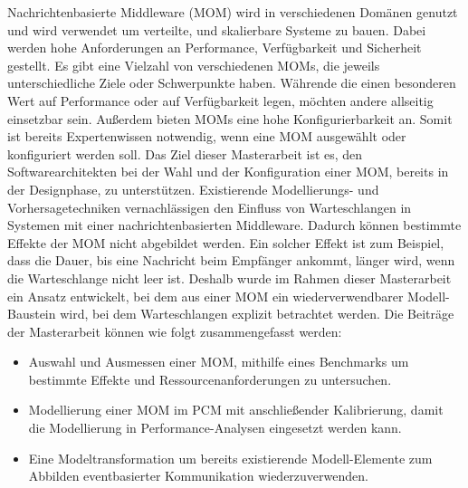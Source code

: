 
\Abstract
Nachrichtenbasierte Middleware (MOM) wird in verschiedenen Domänen genutzt und wird verwendet um verteilte, und skalierbare Systeme zu bauen. Dabei werden hohe Anforderungen an Performance, Verfügbarkeit und Sicherheit gestellt.
Es gibt eine Vielzahl von verschiedenen MOMs, die jeweils unterschiedliche Ziele oder Schwerpunkte haben. Währende die einen besonderen Wert auf Performance oder auf Verfügbarkeit legen, möchten andere allseitig einsetzbar sein. Außerdem bieten MOMs eine hohe Konfigurierbarkeit an. Somit ist bereits Expertenwissen notwendig, wenn eine MOM ausgewählt oder konfiguriert werden soll. Das Ziel dieser Masterarbeit ist es, den Softwarearchitekten bei der Wahl und der Konfiguration einer MOM, bereits in der Designphase, zu unterstützen.
Existierende Modellierungs- und Vorhersagetechniken vernachlässigen den Einfluss von Warteschlangen in Systemen mit einer nachrichtenbasierten Middleware. Dadurch können bestimmte Effekte der MOM nicht abgebildet werden. Ein solcher Effekt ist zum Beispiel, dass die Dauer, bis eine Nachricht beim Empfänger ankommt, länger wird, wenn die Warteschlange nicht leer ist.
Deshalb wurde im Rahmen dieser Masterarbeit ein Ansatz entwickelt, bei dem aus einer MOM ein wiederverwendbarer Modell-Baustein wird, bei dem Warteschlangen explizit betrachtet werden. Die Beiträge der Masterarbeit können wie folgt zusammengefasst werden:
\begin{itemize}
    \item Auswahl und Ausmessen einer MOM, mithilfe eines Benchmarks um bestimmte Effekte und Ressourcenanforderungen zu untersuchen.
    \item Modellierung einer MOM im PCM mit anschließender Kalibrierung, damit die Modellierung in Performance-Analysen eingesetzt werden kann.
    \item Eine Modeltransformation um bereits existierende Modell-Elemente zum Abbilden eventbasierter Kommunikation wiederzuverwenden.
\end{itemize}
